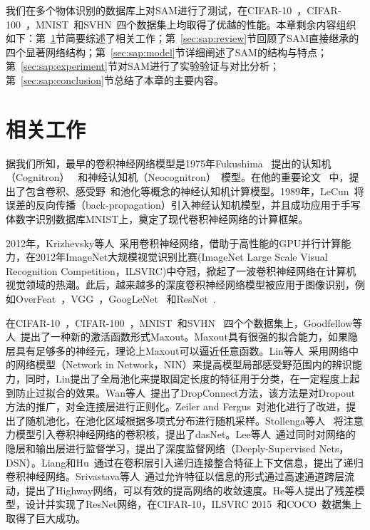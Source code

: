 我们在多个物体识别的数据库上对SAM进行了测试，在CIFAR-10~\cite{krizhevsky2009learning}，CIFAR-100~\cite{krizhevsky2009learning}，MNIST~\cite{lecun1998gradient}和SVHN~\cite{netzer2011reading}四个数据集上均取得了优越的性能。本章剩余内容组织如下：第~\ref{sec:sap:ralate}节简要综述了相关工作；第~\ref{sec:sap:review}节回顾了SAM直接继承的四个显著网络结构；第~\ref{sec:sap:model}节详细阐述了SAM的结构与特点；第~\ref{sec:sap:experiment}节对SAM进行了实验验证与对比分析；第~\ref{sec:sap:conclusion}节总结了本章的主要内容。


\section{相关工作}
\label{sec:sap:ralate}

据我们所知，最早的卷积神经网络模型是1975年Fukushima~\cite{fukushima1982neocognitron} 提出的认知机（Cognitron）~\cite{fukushima1975cognitron} 和神经认知机（Neocognitron）~\cite{fukushima1980neocognitron}模型。在他的重要论文~\cite{fukushima1982neocognitron} 中，提出了包含卷积、感受野~\cite{hubel1959receptive, hubel1962receptive}和池化等概念的神经认知机计算模型。1989年，LeCun~\cite{le1988theoretical, lecun1989backpropagation, le1990handwritten}将误差的反向传播（back-propagation）引入神经认知机模型，并且成功应用于手写体数字识别数据库MNIST上，奠定了现代卷积神经网络的计算框架。

2012年，Krizhevsky等人~\cite{krizhevsky2012imagenet}采用卷积神经网络，借助于高性能的GPU并行计算能力，在2012年ImageNet大规模视觉识别比赛(ImageNet Large Scale Visual Recognition Competition，ILSVRC)中夺冠，掀起了一波卷积神经网络在计算机视觉领域的热潮。此后，越来越多的深度卷积神经网络模型被应用于图像识别，例如OverFeat~\cite{sermanet2013overfeat}，VGG~\cite{simonyan2014very}，GoogLeNet~\cite{szegedy2014going,szegedy2015rethinking,szegedy2016inception} 和ResNet~\cite{he2015deep}.

在CIFAR-10~\cite{krizhevsky2009learning}，CIFAR-100~\cite{krizhevsky2009learning}，MNIST~\cite{lecun1998gradient}和SVHN~\cite{netzer2011reading} 四个个数据集上，Goodfellow等人~\cite{goodfellow2013maxout}提出了一种新的激活函数形式Maxout。Maxout具有很强的拟合能力，如果隐层具有足够多的神经元，理论上Maxout可以逼近任意函数。Lin等人~\cite{DBLP:journals/corr/LinCY13}采用网络中的网络模型（Network in Network，NIN）来提高模型局部感受野范围内的辨识能力，同时，Lin提出了全局池化来提取固定长度的特征用于分类，在一定程度上起到防止过拟合的效果。Wan等人~\cite{wan2013regularization}提出了DropConnect方法，该方法是对Dropout方法的推广，对全连接层进行正则化。Zeiler and Fergus~\cite{zeiler2013stochastic}对池化进行了改进，提出了随机池化，在池化区域根据多项式分布进行随机采样。Stollenga等人~\cite{stollenga2014deep} 将注意力模型引入卷积神经网络的卷积核，提出了dasNet。Lee等人~\cite{lee2014deeply}通过同时对网络的隐层和输出层进行监督学习，提出了深度监督网络（Deeply-Supervised Nets，DSN）。Liang和Hu~\cite{liang2015recurrent}通过在卷积层引入递归连接整合特征上下文信息，提出了递归卷积神经网络。Srivastava等人~\cite{srivastava2015training}通过允许特征以信息的形式通过高速通道跨层流动，提出了Highway网络，可以有效的提高网络的收敛速度。He等人\cite{he2015deep}提出了残差模型，设计并实现了ResNet网络，在CIFAR-10，ILSVRC 2015~\cite{everingham2010pascal}和COCO~\cite{lin2014microsoft}数据集上取得了巨大成功。

